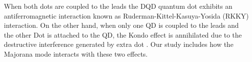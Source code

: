 \documentclass[showpacs,aps,prb,reprint,superscriptaddress]{revtex4-1}
\newcommand{\LUIS}[1]{\textcolor{blue}{\fbox{Luis} {\sl#1}}}
\begin{document}
 When both dots are coupled to the leads the DQD quantum dot exhibits an antiferromagnetic interaction known as  Ruderman-Kittel-Kasuya-Yosida (RKKY) interaction\cite{ruderman_indirect_1954,kasuya_theory_1956,yosida_magnetic_1957}. On the other hand, when only one QD is coupled to the leads and the other Dot is attached to the QD,  the Kondo effect is annihilated due to the destructive interference  generated by extra dot \cite{dias_da_silva_transmission_2008}. Our study includes how the Majorana mode interacts with these two effects.  

























\end{document}
